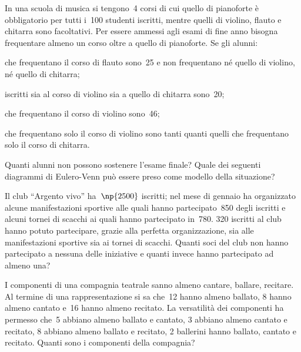 \begin{esercizio}[\Ast]
 \label{ese:5.79}
In una scuola di musica si tengono~4 corsi di cui quello di pianoforte è obbligatorio
per tutti i~100 studenti iscritti, mentre quelli di violino, flauto e
chitarra sono facoltativi. Per essere ammessi agli esami di fine anno
bisogna frequentare almeno un corso oltre a quello di pianoforte. Se gli alunni:

\begin{enumeratea}
 \item che frequentano il corso di flauto sono~25 e non frequentano né quello di violino, né quello di chitarra;
 \item iscritti sia al corso di violino sia a quello di chitarra sono~20;
 \item che frequentano il corso di violino sono~46;
 \item che frequentano solo il corso di violino sono tanti quanti quelli che frequentano solo il corso di chitarra.
\end{enumeratea}

Quanti alunni non possono sostenere l'esame finale?
Quale dei seguenti diagrammi di Eulero-Venn può essere preso come modello della situazione?
\begin{center}
 
\end{center}
\end{esercizio}

\begin{esercizio}[\Ast]
\label{ese:5.80}
Il club ``Argento vivo'' ha~$\np{2500}$ iscritti; nel mese di gennaio ha organizzato alcune
manifestazioni sportive alle quali hanno partecipato~850 degli iscritti
e alcuni tornei di scacchi ai quali hanno partecipato in~780. 320
iscritti al club hanno potuto partecipare, grazie alla perfetta
organizzazione, sia alle manifestazioni sportive sia ai tornei di
scacchi. Quanti soci del club non hanno partecipato a nessuna delle
iniziative e quanti invece hanno partecipato ad almeno una?
\end{esercizio}

\begin{esercizio}[\Ast]
\label{ese:5.81}
I componenti di una compagnia teatrale sanno almeno cantare, ballare,
recitare. Al termine di una rappresentazione si sa che~12 hanno almeno
ballato, 8 hanno almeno cantato e~16 hanno almeno recitato. La
versatilità dei componenti ha permesso che~5 abbiano almeno ballato e
cantato, 3 abbiano almeno cantato e recitato, 8 abbiano almeno ballato e
recitato, 2 ballerini hanno ballato, cantato e recitato. Quanti sono i
componenti della compagnia?
\end{esercizio}

